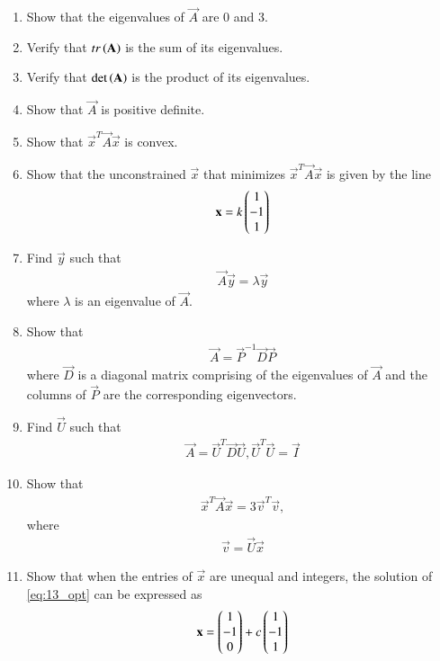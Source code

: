 \documentclass[journal,12pt,twocolumn]{IEEEtran}
\renewcommand\thesection{\arabic{section}}
\begin{document}
\begin{enumerate}[label=\thesection.\arabic*
,ref=\thesection.\theenumi]
\item Show that the eigenvalues of $\vec{A}$ are 0 and 3.
\item Verify that $tr\left(\mathbf{A}\right)$ is the sum of its eigenvalues.
\item Verify that $\det\left(\mathbf{A}\right)$ is the product of  its eigenvalues.
\item Show that $\vec{A}$ is positive definite.
\item Show that $\vec{x}^{T}\vec{A}\vec{x}$ is convex.
\item Show that the unconstrained $\vec{x}$ that minimizes $\vec{x}^{T}\vec{A}\vec{x}$ is given by the line
\begin{align}
\mathbf{x} = k \begin{pmatrix}1 \\ -1 \\ 1\end{pmatrix}
\end{align}
\item Find $\vec{y}$ such that 
\begin{align}
\vec{A}\vec{y} = \lambda\vec{y}
\end{align}
where $\lambda$ is an eigenvalue of $\vec{A}$.
\item Show that 
\begin{align}
\vec{A} = \vec{P}^{-1} \vec{D}\vec{P}
\end{align}
%
where $\vec{D}$  is a diagonal matrix comprising of the eigenvalues of $\vec{A}$
and the columns of $\vec{P}$ are the corresponding eigenvectors.
\item Find $\vec{U}$ such that 
\begin{align}
\vec{A} = \vec{U}^{T} \vec{D}\vec{U}, \vec{U}^{T} \vec{U} = \vec{I}
\end{align}
\item Show that 
\begin{align}
\vec{x}^T \vec{A}\vec{x}  = 3 \vec{v}^{T} \vec{v},
\end{align}
where
\begin{align}
\vec{v} = \vec{U}\vec{x}
\end{align}
%
\item Show that when the entries of $\vec{x}$ are unequal and integers, the solution of \eqref{eq:13_opt} can be expressed as
\begin{align}
\mathbf{x} = \begin{pmatrix}1 \\ -1 \\ 0\end{pmatrix} + c\begin{pmatrix}1 \\ -1 \\ 1\end{pmatrix}
\end{align}

\end{enumerate}
\end{document}

